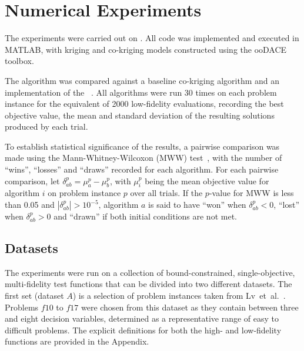 \section{Numerical Experiments}\label{sec:exp}
The experiments were carried out on . All code was implemented and executed in MATLAB, with kriging and co-kriging models constructed using the ooDACE toolbox.

The \AlgName{} algorithm was compared against a baseline co-kriging algorithm and an implementation of the \motos{}~\cite{xu2016mo2tos}. All algorithms were run 30 times on each problem instance for the equivalent of 2000 low-fidelity evaluations, recording the best objective value, the mean and standard deviation of the resulting solutions produced by each trial.

To establish statistical significance of the results, a pairwise comparison was made using the Mann-Whitney-Wilcoxon (MWW) test~\cite{mann1947test}, with the number of ``wins'', ``losses'' and ``draws'' recorded for each algorithm. For each pairwise comparison, let $\delta^p_{ab} = \mu^p_a - \mu^p_b$, with $\mu^p_i$ being the mean objective value for algorithm $i$ on problem instance $p$ over all trials. If the $p$-value for MWW is less than 0.05 and $|\delta^p_{ab}| > 10^{-5}$, algorithm $a$ is said to have ``won'' when $\delta^p_{ab} < 0$, ``lost'' when $\delta^p_{ab} > 0$ and ``drawn'' if both initial conditions are not met.

\subsection{Datasets}
The experiments were run on a collection of bound-constrained, single-objective, multi-fidelity test functions that can be divided into two different datasets. The first set (dataset $A$) is a selection of problem instances taken from Lv~et~al.~\cite{lv2021multi}. Problems $f10$ to $f17$ were chosen from this dataset as they contain between three and eight decision variables, determined as a representative range of easy to difficult problems. The explicit definitions for both the high- and low-fidelity functions are provided in the Appendix.

